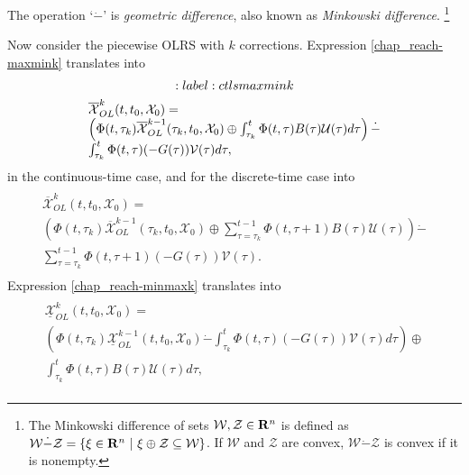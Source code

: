 \documentclass[letterpaper,10pt,english]{sphinxmanual}
\begin{document}
The operation ‘$\dot{-}$’ is \emph{geometric difference}, also known as
\emph{Minkowski difference}. \footnote{
The Minkowski difference of sets
${\mathcal W}, {\mathcal Z}\in{\bf R}^n$ is defined as
${\mathcal W}\dot{-}{\mathcal Z}= \left\{\xi\in{\bf R}^n ~|~
\xi \oplus {\mathcal Z}\subseteq {\mathcal W}\right\}$. If
${\mathcal W}$ and ${\mathcal Z}$ are convex,
${\mathcal W}\dot{-}{\mathcal Z}$ is convex if it is nonempty.
}

Now consider the piecewise OLRS with $k$ corrections. Expression
\eqref{chap_reach-maxmink} translates into
\begin{gather}
\begin{split}:label:ctlsmaxmink\end{split}\notag\\\begin{split}\begin{array}{l}
\overline{{\mathcal X}}_{OL}^k(t, t_0, {\mathcal X}_0) = \\
\left(\Phi(t, \tau_k)\overline{{\mathcal X}}_{OL}^{k-1}(\tau_k, t_0, {\mathcal X}_0) \oplus
\int_{\tau_k}^t\Phi(t, \tau)B(\tau){\mathcal U}(\tau)d\tau\right) \dot{-} \\
\int_{\tau_k}^t\Phi(t, \tau)(-G(\tau)){\mathcal V}(\tau)d\tau,
\end{array}\end{split}\notag
\end{gather}
in the continuous-time case, and for the discrete-time case into
\label{chap_reach:equation-dtlsmaxmink}\begin{gather}
\begin{split}\begin{array}{l}
\overline{{\mathcal X}}_{OL}^k(t, t_0, {\mathcal X}_0) = \\
\left(\Phi(t, \tau_k)\overline{{\mathcal X}}_{OL}^{k-1}(\tau_k, t_0, {\mathcal X}_0) \oplus
\sum_{\tau=\tau_k}^{t-1}\Phi(t, \tau+1)B(\tau){\mathcal U}(\tau)\right) \dot{-} \\
\sum_{\tau=\tau_k}^{t-1}\Phi(t, \tau+1)(-G(\tau)){\mathcal V}(\tau).
\end{array}\end{split}\label{chap_reach-dtlsmaxmink}
\end{gather}
Expression \eqref{chap_reach-minmaxk} translates into
\label{chap_reach:equation-ctlsminmaxk}\begin{gather}
\begin{split}\begin{array}{l}
\underline{{\mathcal X}}_{OL}^k(t, t_0, {\mathcal X}_0) = \\
\left(\Phi(t, \tau_k)\underline{{\mathcal X}}_{OL}^{k-1}(t, t_0, {\mathcal X}_0) \dot{-}
\int_{\tau_k}^t\Phi(t, \tau)(-G(\tau)){\mathcal V}(\tau)d\tau\right)
\oplus \\
\int_{\tau_k}^t\Phi(t, \tau)B(\tau){\mathcal U}(\tau)d\tau,
\end{array}\end{split}\label{chap_reach-ctlsminmaxk}
\end{gather}
\end{document}
